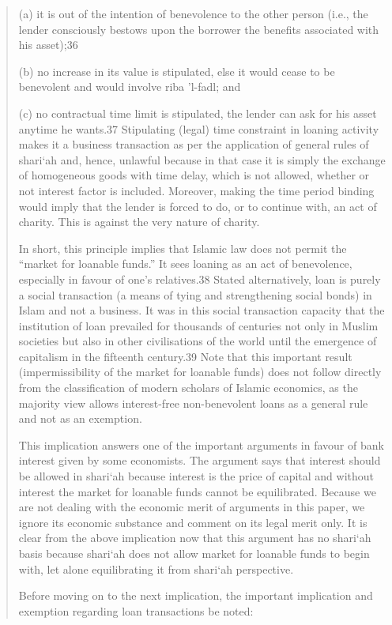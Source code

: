 \begin{quote}
(a) it is out of the intention of benevolence to the other person (i.e., the lender consciously bestows upon the borrower the benefits associated with his asset);36

(b) no increase in its value is stipulated, else it would cease to be benevolent and would involve riba 'l-fadl; and

(c) no contractual time limit is stipulated, the lender can ask for his asset anytime he wants.37 Stipulating (legal) time constraint in loaning activity makes it a business transaction as per the application of general rules of shari‘ah and, hence, unlawful because in that case it is simply the exchange of homogeneous goods with time delay, which is not allowed, whether or not interest factor is included. Moreover, making the time period binding would imply that the lender is forced to do, or to continue with, an act of charity. This is against the very nature of charity.

In short, this principle implies that Islamic law does not permit the “market for loanable funds.” It sees loaning as an act of benevolence, especially in favour of one's relatives.38 Stated alternatively, loan is purely a social transaction (a means of tying and strengthening social bonds) in Islam and not a business. It was in this social transaction capacity that the institution of loan prevailed for thousands of centuries not only in Muslim societies but also in other civilisations of the world until the emergence of capitalism in the fifteenth century.39 Note that this important result (impermissibility of the market for loanable funds) does not follow directly from the classification of modern scholars of Islamic economics, as the majority view allows interest-free non-benevolent loans as a general rule and not as an exemption.

This implication answers one of the important arguments in favour of bank interest given by some economists. The argument says that interest should be allowed in shari‘ah because interest is the price of capital and without interest the market for loanable funds cannot be equilibrated. Because we are not dealing with the economic merit of arguments in this paper, we ignore its economic substance and comment on its legal merit only. It is clear from the above implication now that this argument has no shari‘ah basis because shari‘ah does not allow market for loanable funds to begin with, let alone equilibrating it from shari‘ah perspective.

Before moving on to the next implication, the important implication and exemption regarding loan transactions be noted:


\end{quote}
